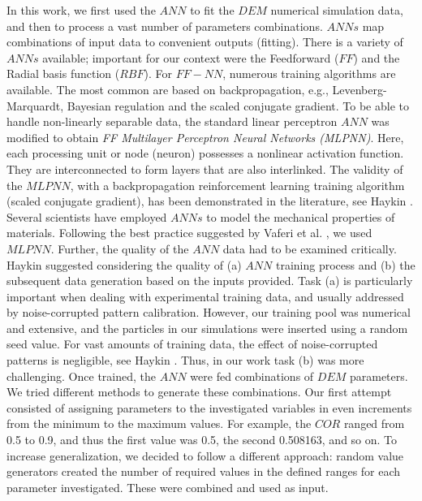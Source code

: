 In this work, we first used the $ANN$ to fit the $DEM$ numerical simulation
data, and then to process a vast number of parameters combinations. 
$ANNs$ map combinations of input data to convenient outputs (fitting). 
There is a variety of $ANNs$ available; important for our context were the
Feedforward ($FF$) and the Radial basis function ($RBF$). For $FF-NN$, 
numerous training algorithms are available. The most common are based on
backpropagation, e.g., Levenberg-Marquardt, Bayesian regulation and the scaled
conjugate gradient.
To be able to handle non-linearly separable data, the standard linear perceptron
$ANN$ was modified to obtain \textit{FF Multilayer Perceptron Neural Networks
(MLPNN)}.
Here, each processing unit or node (neuron) possesses a nonlinear activation function. 
They are interconnected to form layers that are also interlinked. 
The validity of the $MLPNN$, with a backpropagation reinforcement learning 
training algorithm (scaled conjugate gradient), has been demonstrated in the 
literature, see Haykin \cite{RefWorks:158}. Several scientists 
\cite{RefWorks:161, RefWorks:166, RefWorks:167, RefWorks:168, RefWorks:169,
RefWorks:170, RefWorks:178, RefWorks:179} have employed $ANNs$ to model
the mechanical properties of materials.
Following the best practice suggested by Vaferi et al. \cite{RefWorks:150}, we
used $MLPNN$.
Further, the quality of the $ANN$ data had to be examined critically. 
Haykin \cite{RefWorks:158} 
suggested considering the quality of (a) $ANN$ training process and (b) the
subsequent data generation based on the inputs provided.
Task (a) is particularly important
when dealing with experimental training data, and
usually addressed
by noise-corrupted pattern calibration.
However, our training pool was numerical and extensive, 
and the particles in our simulations were inserted using a random
seed value.
For vast amounts of training data, the effect of noise-corrupted patterns is
negligible, see Haykin \cite{RefWorks:158}.
Thus, in our work task (b) was more challenging.
Once trained, the $ANN$ were fed
combinations of $DEM$ parameters. 
We tried different methods to generate these combinations. 
Our first attempt consisted of assigning parameters to the investigated
variables in even increments from the minimum to the maximum values. 
For example, the $COR$ ranged from 0.5 to 0.9, and thus the first value was
0.5, the second 0.508163, and so on.
To increase generalization, we decided to follow a different approach: 
random value generators created the number of required values in the defined
ranges for each parameter investigated.
These were combined and used as input.\\
